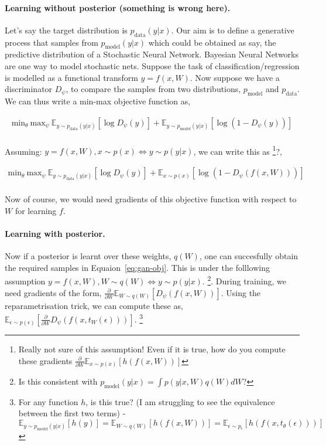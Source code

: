 \documentclass[twoside]{article}
\begin{document}
\paragraph{Learning without posterior (something is wrong here). }
Let's say the target distribution is $p_{\text{data}}(y|x)$. Our aim is to define a generative process that samples from $p_{\text{model}}(y|x)$ which could be obtained as say, the predictive distribution of a Stochastic Neural Network. Bayesian Neural Networks are one way to model stochastic nets. Suppose the task of classification/regression is modelled as a functional transform $y=f(x,W)$. Now suppose we have a discriminator $D_\psi$, to compare the samples from two distributions, $p_{\text{model}}$ and $p_{\text{data}}$. We can thus write a min-max objective function as,

\begin{align}
\text{min}_\theta\ \text{max}_\psi\ \mathbb{E}_{y\sim p_{\text{data}}(y|x)}[\log D_\psi(y)] + \mathbb{E}_{y\sim p_{\text{model}}(y|x)}[\log \left( 1-D_\psi(y) \right) ]\\
\end{align}

Assuming: $y = f(x,W), x \sim p(x) \iff y \sim p(y|x)$, we can write this as \footnote{Really not sure of this assumption! Even if it is true, how do you compute these gradients $\frac{\partial}{\partial W} \mathbb{E}_{x\sim p(x)}[h(f(x,W))]$}?,

\begin{align}
\text{min}_\theta\ \text{max}_\psi\ \mathbb{E}_{y\sim p_{\text{data}}(y|x)}[\log D_\psi(y)] + \mathbb{E}_{x\sim p(x)}[\log \left( 1-D_\psi(f(x,W)) \right) ]\\
\end{align}

Now of course, we would need gradients of this objective function with respect to $W$ for learning $f$. 

\paragraph{Learning with posterior. }
Now if a posterior is learnt over these weights, $q(W)$, one can succesfully obtain the required samples in Equaion~\eqref{eq:gan-obj}. This is under the folllowing assumption $y = f(x,W), W \sim q(W) \iff y \sim p(y|x)$. \footnote{Is this consistent with $p_{\text{model}}(y|x) = \int p(y|x,W)q(W) dW$?}. During training, we need gradients of the form, $\frac{\partial}{\partial W} \mathbb{E}_{W\sim q(W)}[D_\psi(f(x,W))]$. Using the reparametrisation trick, we can compute these as, $\mathbb{E}_{\epsilon \sim p(\epsilon)}\left[\frac{\partial}{\partial W} D_\psi(f(x,t_W(\epsilon)))\right]$. \footnote{For any function $h$, is this true? (I am struggling to see the equivalence between the first two terms) - $\mathbb{E}_{y\sim p_{\text{model}}(y|x)}[h(y)] = \mathbb{E}_{W\sim q(W)}[h(f(x,W))] = \mathbb{E}_{\epsilon\sim p_{\epsilon}}[h(f(x,t_\theta(\epsilon)))]$}
\end{document}
